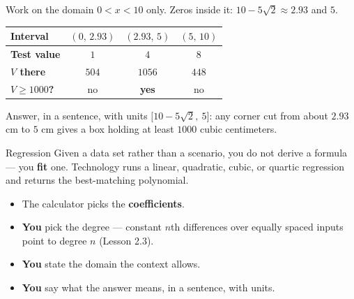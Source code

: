 \documentclass[aspectratio=169, 11pt]{beamer}
\begin{document}
\begin{frame}[t, plain]

  Work on the domain \(0 < x < 10\) only. Zeros inside it:
  \(10 - 5\sqrt{2} \approx 2.93\) and \(5\).

  \bigskip
  \begin{center}
  \renewcommand{\arraystretch}{1.4}
  \begin{tabular}{|l|c|c|c|}
  \hline
  \textbf{Interval} & \((0,\,2.93)\) & \((2.93,\,5)\) & \((5,\,10)\) \\
  \hline
  \textbf{Test value} & \(1\) & \(4\) & \(8\) \\
  \hline
  \textbf{\(V\) there} & \(504\) & \(1056\) & \(448\) \\
  \hline
  \textbf{\(V \ge 1000\)?} & no & \textbf{yes} & no \\
  \hline
  \end{tabular}
  \end{center}

  \bigskip
  \begin{block}{Answer, in a sentence, with units}
    \(\big[10 - 5\sqrt{2},\ 5\big]\): any corner cut from about \(2.93\) cm to
    \(5\) cm gives a box holding at least \(1000\) cubic centimeters.
  \end{block}
\end{frame}

\begin{frame}[t, plain]

  \begin{block}{Regression}
    Given a data set rather than a scenario, you do not derive a formula --- you
    \textbf{fit} one. Technology runs a linear, quadratic, cubic, or quartic
    regression and returns the best-matching polynomial.
  \end{block}

  \bigskip
  \begin{itemize}\setlength{\itemsep}{10pt}
    \item The calculator picks the \textbf{coefficients}.
    \item \textbf{You} pick the degree --- constant \(n\)th differences over
          equally spaced inputs point to degree \(n\) (Lesson 2.3).
    \item \textbf{You} state the domain the context allows.
    \item \textbf{You} say what the answer means, in a sentence, with units.
  \end{itemize}
\end{frame}
\end{document}
